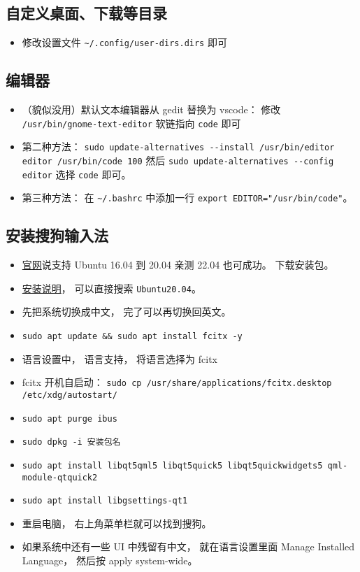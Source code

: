 \subsection{自定义桌面、下载等目录}
\begin{itemize}
\item 修改设置文件 \verb|~/.config/user-dirs.dirs| 即可
\end{itemize}

\subsection{编辑器}
\begin{itemize}
\item （貌似没用）默认文本编辑器从 gedit 替换为 vscode： 修改 \verb`/usr/bin/gnome-text-editor` 软链指向 \verb`code` 即可
\item 第二种方法： \verb|sudo update-alternatives --install /usr/bin/editor editor /usr/bin/code 100| 然后 \verb|sudo update-alternatives --config editor| 选择 \verb|code| 即可。
\item 第三种方法： 在 \verb|~/.bashrc| 中添加一行 \verb|export EDITOR="/usr/bin/code"|。
\end{itemize}

\subsection{安装搜狗输入法}
\begin{itemize}
\item \href{https://shurufa.sogou.com/linux}{官网}说支持 Ubuntu 16.04 到 20.04 亲测 22.04 也可成功。 下载安装包。
\item \href{https://shurufa.sogou.com/linux/guide}{安装说明}， 可以直接搜索 \verb|Ubuntu20.04|。
\item 先把系统切换成中文， 完了可以再切换回英文。
\item \verb|sudo apt update && sudo apt install fcitx -y|
\item 语言设置中， 语言支持， 将语言选择为 fcitx
\item fcitx 开机自启动： \verb|sudo cp /usr/share/applications/fcitx.desktop /etc/xdg/autostart/|
\item \verb|sudo apt purge ibus|
\item \verb|sudo dpkg -i 安装包名|
\item \verb|sudo apt install libqt5qml5 libqt5quick5 libqt5quickwidgets5 qml-module-qtquick2|
\item \verb|sudo apt install libgsettings-qt1|
\item 重启电脑， 右上角菜单栏就可以找到搜狗。
\item 如果系统中还有一些 UI 中残留有中文， 就在语言设置里面 Manage Installed Language， 然后按 apply system-wide。
\end{itemize}


